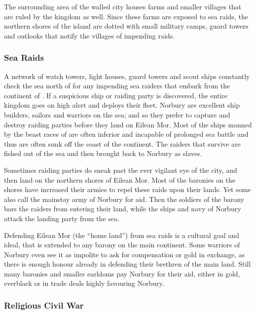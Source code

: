 The surrounding area of the walled city houses farms and smaller villages that
are ruled by the kingdom as well. Since these farms are exposed to sea raids,
the northern shores of the island are dotted with small military camps, guard
towers and outlooks that notify the villages of impending raids.

\subsubsection{Sea Raids}

A network of watch towers, light houses, guard towers and scout ships
constantly check the sea north of  for any impending
sea raiders that embark from the continent of . If a
suspicious ship or raiding party is discovered, the entire kingdom goes on
high alert and deploys their fleet. Norbury are excellent ship builders,
sailors and warriors on the sea; and so they prefer to capture and destroy
raiding parties before they land on Eilean Mor. Most of the ships manned by
the beast races of  are often inferior and incapable of
prolonged sea battle and thus are often sunk off the coast of the
continent. The raiders that survive are fished out of the sea and then brought
back to Norbury as slaves.

Sometimes raiding parties do sneak past the ever vigilant eye of the city,
and then land on the northern shores of Eilean Mor. Most of the baronies
on the shores have increased their armies to repel these raids upon their
lands. Yet some also call the mainstay army of Norbury for aid. Then the
soldiers of the barony bars the raiders from entering their land, while the
ships and navy of Norbury attack the landing party from the sea.

Defending Eilean Mor (the ``home land'') from sea raids is a cultural goal and
ideal, that is extended to any barony on the main continent. Some warriors of
Norbury even see it as impolite to ask for compensation or gold in exchange,
as there is enough honour already in defending their brethren of the main
land. Still many baronies and smaller earldoms pay Norbury for their aid,
either in gold, everblack or in trade deals highly favouring Norbury.

\subsubsection{Religious Civil War}
\label{sec:Religious Civil War}

